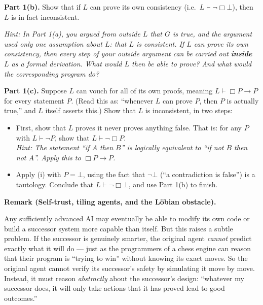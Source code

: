 \documentclass[8pt]{article}
\begin{document}
\medskip
\noindent
\textbf{Part 1(b).} Show that if $L$ can prove its own consistency (i.e.\
$L \vdash \neg\Box\bot$), then $L$ is in fact inconsistent.

\medskip
\noindent
\emph{Hint: In Part 1(a), you argued from outside $L$ that $G$ is true, and the
argument used only one assumption about $L$: that $L$ is consistent. If $L$ can prove
its own consistency, then every step of your outside argument can be carried out
\textbf{inside} $L$ as a formal derivation. What would $L$ then be able to prove?
And what would the corresponding program do?}

\medskip
\noindent
\textbf{Part 1(c).} Suppose $L$ can vouch for all of its own proofs, meaning
$L \vdash \Box P \to P$ for every statement $P$. (Read this as: ``whenever $L$ can
prove $P$, then $P$ is actually true,'' and $L$ itself asserts this.) Show that $L$ is
inconsistent, in two steps:

\begin{itemize}
  \item[(i)] First, show that $L$ proves it never proves anything false. That is: for
    any $P$ with $L \vdash \neg P$, show that $L \vdash \neg\Box P$.\\
    \emph{Hint: The statement ``if $A$ then $B$'' is logically equivalent to ``if not
    $B$ then not $A$''. Apply this to $\Box P \to P$.}
  \item[(ii)] Apply (i) with $P = \bot$, using the fact that $\neg\bot$ (``a
    contradiction is false'') is a tautology. Conclude that
    $L \vdash \neg\Box\bot$, and use Part 1(b) to finish.
\end{itemize}

\medskip
\noindent
\textbf{Remark (Self-trust, tiling agents, and the L\"obian obstacle).}

\medskip
\noindent
Any sufficiently advanced AI may eventually be able to modify its own code or build a
successor system more capable than itself. But this raises a subtle problem. If the
successor is genuinely smarter, the original agent \emph{cannot} predict exactly what
it will do --- just as the programmers of a chess engine can reason that their program
is ``trying to win'' without knowing its exact moves. So the original agent cannot
verify its successor's safety by simulating it move by move. Instead, it must reason
\emph{abstractly} about the successor's design: ``whatever my successor does, it will
only take actions that it has proved lead to good outcomes.''
\end{document}
